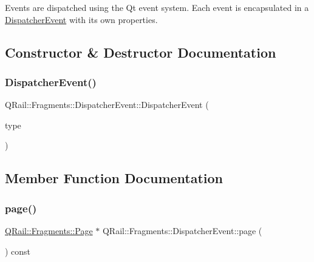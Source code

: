 Events are dispatched using the Qt event system. Each event is encapsulated in a \mbox{\hyperlink{classQRail_1_1Fragments_1_1DispatcherEvent}{Dispatcher\+Event}} with its own properties. 

\subsection{Constructor \& Destructor Documentation}
\mbox{\label{classQRail_1_1Fragments_1_1DispatcherEvent_ad98ef5840c2b15977eb5c5c92204342d}} 
\subsubsection{\texorpdfstring{DispatcherEvent()}{DispatcherEvent()}}
{\footnotesize\ttfamily Q\+Rail\+::\+Fragments\+::\+Dispatcher\+Event\+::\+Dispatcher\+Event (\begin{DoxyParamCaption}\item[{const Q\+Event\+::\+Type \&}]{type }\end{DoxyParamCaption})\hspace{0.3cm}{\ttfamily [inline]}}



\subsection{Member Function Documentation}
\mbox{\label{classQRail_1_1Fragments_1_1DispatcherEvent_a05e755262183efedfa43226a8ff3e752}} 
\subsubsection{\texorpdfstring{page()}{page()}}
{\footnotesize\ttfamily \mbox{\hyperlink{classQRail_1_1Fragments_1_1Page}{Q\+Rail\+::\+Fragments\+::\+Page}} $\ast$ Q\+Rail\+::\+Fragments\+::\+Dispatcher\+Event\+::page (\begin{DoxyParamCaption}{ }\end{DoxyParamCaption}) const}


